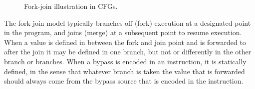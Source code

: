 \begin{figure}[t]
\centering
{}
\hfil
{}
\caption{Fork-join illustration in CFGs.}
\label{fig:fork_join}
\end{figure}

The fork-join model typically branches off (fork) execution at a designated point in the program, and joins (merge) at a subsequent point to resume execution. %
When a value is defined in between the fork and join point and is forwarded to after the join it may be defined in one branch, but not or differently in the other branch or branches. When a bypass is encoded in an instruction, it is statically defined, in the sense that whatever branch is taken the value that is forwarded should always come from the bypass source that is encoded in the instruction. 


